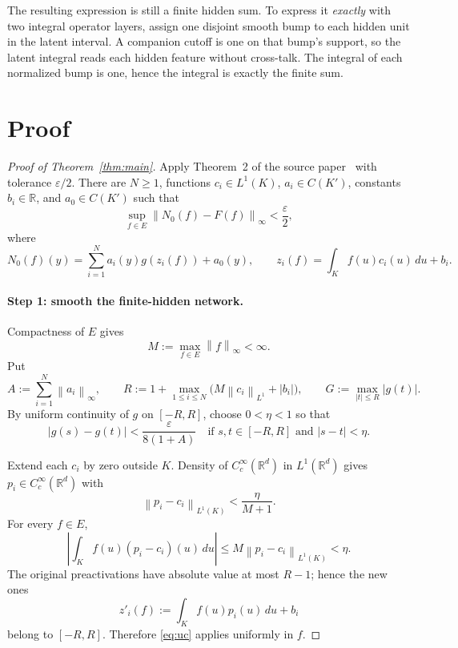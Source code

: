 \documentclass[11pt]{article}
\newcommand{\R}{\mathbb{R}}
\newcommand{\norm}[1]{\left\lVert #1\right\rVert}
\begin{document}
The resulting expression is still a finite hidden sum.  To express it
\emph{exactly} with two integral operator layers, assign one disjoint smooth
bump to each hidden unit in the latent interval.  A companion cutoff is one
on that bump's support, so the latent integral reads each hidden feature
without cross-talk.  The integral of each normalized bump is one, hence the
integral is exactly the finite sum.

\section{Proof}

\begin{proof}[Proof of Theorem~\ref{thm:main}]
Apply Theorem~2 of the source paper~\cite{GS} with tolerance
$\varepsilon/2$.  There are $N\geq1$, functions
$c_i\in L^1(K)$, $a_i\in C(K')$, constants $b_i\in\R$, and
$a_0\in C(K')$ such that
\begin{equation}\label{eq:source-approx}
 \sup_{f\in E}\norm{N_0(f)-F(f)}_\infty<\frac{\varepsilon}{2},
\end{equation}
where
\[
 N_0(f)(y)=\sum_{i=1}^N a_i(y)g(z_i(f))+a_0(y),
 \qquad
 z_i(f)=\int_K f(u)c_i(u)\,du+b_i.
\]

\paragraph{Step 1: smooth the finite-hidden network.}
Compactness of $E$ gives
\[
 M:=\max_{f\in E}\norm{f}_\infty<\infty.
\]
Put
\[
 A:=\sum_{i=1}^N\norm{a_i}_\infty,
 \qquad
 R:=1+\max_{1\leq i\leq N}\bigl(M\norm{c_i}_{L^1}+|b_i|\bigr),
 \qquad
 G:=\max_{|t|\leq R}|g(t)|.
\]
By uniform continuity of $g$ on $[-R,R]$, choose $0<\eta<1$ so that
\begin{equation}\label{eq:uc}
 |g(s)-g(t)|<\frac{\varepsilon}{8(1+A)}
 \quad\text{if }s,t\in[-R,R]\text{ and }|s-t|<\eta.
\end{equation}

Extend each $c_i$ by zero outside $K$.  Density of
$C_c^\infty(\R^d)$ in $L^1(\R^d)$ gives $p_i\in C_c^\infty(\R^d)$ with
\begin{equation}\label{eq:input-smooth}
 \norm{p_i-c_i}_{L^1(K)}<\frac{\eta}{M+1}.
\end{equation}
For every $f\in E$,
\[
 \left|\int_K f(u)(p_i-c_i)(u)\,du\right|
 \leq M\norm{p_i-c_i}_{L^1(K)}<\eta.
\]
The original preactivations have absolute value at most $R-1$; hence the new
ones
\[
 z'_i(f):=\int_K f(u)p_i(u)\,du+b_i
\]
belong to $[-R,R]$.  Therefore \eqref{eq:uc} applies uniformly in $f$.


\end{proof}
\end{document}
